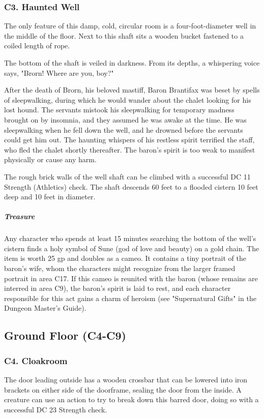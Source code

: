 \documentclass[10pt,a4paper,twoside,bg=print,twocolumn,openany,nodeprecatedcode]{dndbook}
\begin{document}
\subsubsection{C3. Haunted Well}
\begin{DndReadAloud}{}
The only feature of this damp, cold, circular room is a four-foot-diameter well in the middle of the floor. Next to this shaft sits a wooden bucket fastened to a coiled length of rope.

The bottom of the shaft is veiled in darkness. From its depths, a whispering voice says, "Brorn! Where are you, boy?" 

\end{DndReadAloud}

After the death of Brorn, his beloved mastiff, Baron Brantifax was beset by spells of sleepwalking, during which he would wander about the chalet looking for his lost hound. The servants mistook his sleepwalking for temporary madness brought on by insomnia, and they assumed he was awake at the time. He was sleepwalking when he fell down the well, and he drowned before the servants could get him out. The haunting whispers of his restless spirit terrified the staff, who fled the chalet shortly thereafter. The baron's spirit is too weak to manifest physically or cause any harm.

The rough brick walls of the well shaft can be climbed with a successful DC 11 Strength (Athletics) check. The shaft descends 60 feet to a flooded cistern 10 feet deep and 10 feet in diameter.

\subparagraph{Treasure}
Any character who spends at least 15 minutes searching the bottom of the well's cistern finds a holy symbol of Sune (god of love and beauty) on a gold chain. The item is worth 25 gp and doubles as a cameo. It contains a tiny portrait of the baron's wife, whom the characters might recognize from the larger framed portrait in area C17. If this cameo is reunited with the baron (whose remains are interred in area C9), the baron's spirit is laid to rest, and each character responsible for this act gains a charm of heroism (see "Supernatural Gifts" in the Dungeon Master's Guide).

\subsection{Ground Floor (C4-C9)}
\subsubsection{C4. Cloakroom}
The door leading outside has a wooden crossbar that can be lowered into iron brackets on either side of the doorframe, sealing the door from the inside. A creature can use an action to try to break down this barred door, doing so with a successful DC 23 Strength check.
\end{document}
